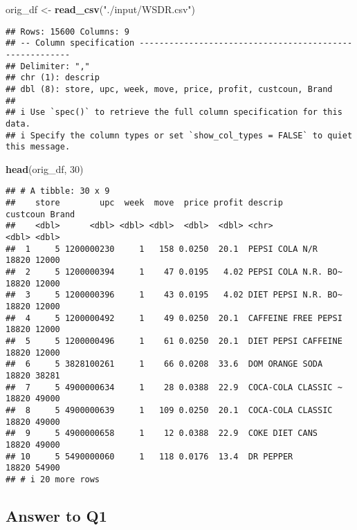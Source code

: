 \documentclass[
]{article}
\newenvironment{Shaded}{\begin{snugshade}}{\end{snugshade}}
\newcommand{\DecValTok}[1]{\textcolor[rgb]{0.00,0.00,0.81}{#1}}
\newcommand{\FunctionTok}[1]{\textcolor[rgb]{0.13,0.29,0.53}{\textbf{#1}}}
\newcommand{\NormalTok}[1]{#1}
\newcommand{\OtherTok}[1]{\textcolor[rgb]{0.56,0.35,0.01}{#1}}
\newcommand{\StringTok}[1]{\textcolor[rgb]{0.31,0.60,0.02}{#1}}
\begin{document}
\begin{Shaded}
\begin{Highlighting}[]
\NormalTok{orig\_df }\OtherTok{\textless{}{-}} \FunctionTok{read\_csv}\NormalTok{(}\StringTok{"./input/WSDR.csv"}\NormalTok{)}
\end{Highlighting}
\end{Shaded}

\begin{verbatim}
## Rows: 15600 Columns: 9
## -- Column specification --------------------------------------------------------
## Delimiter: ","
## chr (1): descrip
## dbl (8): store, upc, week, move, price, profit, custcoun, Brand
## 
## i Use `spec()` to retrieve the full column specification for this data.
## i Specify the column types or set `show_col_types = FALSE` to quiet this message.
\end{verbatim}

\begin{Shaded}
\begin{Highlighting}[]
\FunctionTok{head}\NormalTok{(orig\_df, }\DecValTok{30}\NormalTok{)}
\end{Highlighting}
\end{Shaded}

\begin{verbatim}
## # A tibble: 30 x 9
##    store        upc  week  move  price profit descrip             custcoun Brand
##    <dbl>      <dbl> <dbl> <dbl>  <dbl>  <dbl> <chr>                  <dbl> <dbl>
##  1     5 1200000230     1   158 0.0250  20.1  PEPSI COLA N/R         18820 12000
##  2     5 1200000394     1    47 0.0195   4.02 PEPSI COLA N.R. BO~    18820 12000
##  3     5 1200000396     1    43 0.0195   4.02 DIET PEPSI N.R. BO~    18820 12000
##  4     5 1200000492     1    49 0.0250  20.1  CAFFEINE FREE PEPSI    18820 12000
##  5     5 1200000496     1    61 0.0250  20.1  DIET PEPSI CAFFEINE    18820 12000
##  6     5 3828100261     1    66 0.0208  33.6  DOM ORANGE SODA        18820 38281
##  7     5 4900000634     1    28 0.0388  22.9  COCA-COLA CLASSIC ~    18820 49000
##  8     5 4900000639     1   109 0.0250  20.1  COCA-COLA CLASSIC      18820 49000
##  9     5 4900000658     1    12 0.0388  22.9  COKE DIET CANS         18820 49000
## 10     5 5490000060     1   118 0.0176  13.4  DR PEPPER              18820 54900
## # i 20 more rows
\end{verbatim}

\hypertarget{answer-to-q1}{%
\subsection{Answer to Q1}\label{answer-to-q1}}
\end{document}

